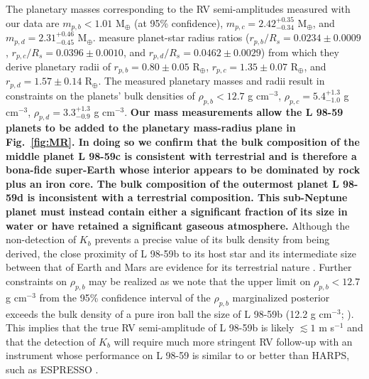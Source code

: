 \documentclass[longauth]{aa}
\newcommand{\mps}{m s$^{-1}$}
\newcommand{\gcm}{g cm$^{-3}$}
\begin{document}
The planetary masses corresponding to the RV semi-amplitudes measured with our data are $m_{p,b} < 1.01$ M$_{\oplus}$ (at 95\% confidence), $m_{p,c}=2.42^{+0.35}_{-0.34}$ M$_{\oplus}$, and $m_{p,d}=2.31^{+0.46}_{-0.45}$ M$_{\oplus}$.  measure planet-star radius ratios ($r_{p,b}/R_s=0.0234\pm 0.0009$, $r_{p,c}/R_s=0.0396\pm 0.0010$, and $r_{p,d}/R_s=0.0462\pm 0.0029$) from which they derive planetary radii of $r_{p,b}=0.80\pm 0.05$ R$_{\oplus}$, $r_{p,c}=1.35\pm 0.07$ R$_{\oplus}$, and $r_{p,d}=1.57\pm 0.14$ R$_{\oplus}$. The measured planetary masses and radii result in constraints on the planets' bulk densities of $\rho_{p,b}<12.7$ \gcm{,} $\rho_{p,c}=5.4^{+1.3}_{-1.0}$ \gcm{,} $\rho_{p,d}=3.3^{+1.3}_{-0.9}$ \gcm{.} \textbf{Our mass measurements allow the L 98-59 planets to be added to the planetary mass-radius plane in Fig.~\ref{fig:MR}. In doing so we confirm that the bulk composition of the middle planet L 98-59c is consistent with terrestrial and is therefore a bona-fide super-Earth whose interior appears to be dominated by rock plus an iron core. The bulk composition of the outermost planet L 98-59d is inconsistent with a terrestrial composition. This sub-Neptune planet must instead contain either a significant fraction of its size in water or have retained a significant gaseous atmosphere.} Although the non-detection of $K_b$ prevents a precise value of its bulk density from being derived, the close proximity of L 98-59b to its host star and its intermediate size between that of Earth and Mars are evidence for its terrestrial nature \citep{owen13,jin14,lopez14,chen16,lopez16,owen17}. Further constraints on $\rho_{p,b}$ may be realized as we note that the upper limit on $\rho_{p,b}<12.7$ \gcm{} from the 95\% confidence interval of the $\rho_{p,b}$ marginalized posterior exceeds the bulk density of a pure iron ball the size of L 98-59b (12.2 \gcm{;} \citealt{zeng13}). This implies that the true RV semi-amplitude of L 98-59b is likely $\lesssim 1$ \mps{} and that the detection of $K_b$ will require much more stringent RV follow-up with an instrument whose performance on L 98-59 is similar to or better than HARPS, such as ESPRESSO \citep{pepe10}.
\end{document}
